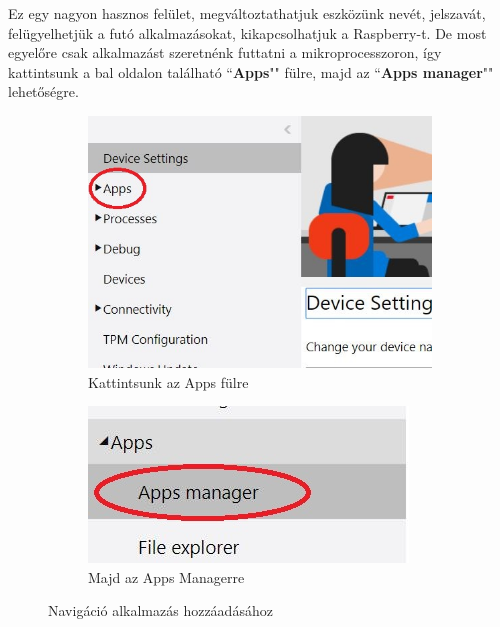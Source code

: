 \documentclass[a4paper,12pt]{report}
\begin{document}
    Ez egy nagyon hasznos felület, megváltoztathatjuk eszközünk nevét, jelszavát, felügyelhetjük a futó alkalmazásokat,
    kikapcsolhatjuk a Raspberry-t. De most egyelőre csak alkalmazást szeretnénk futtatni a mikroprocesszoron, így kattintsunk
    a bal oldalon található ``\textbf{Apps}"" fülre, majd az ``\textbf{Apps manager}"" lehetőségre.

\begin{figure}[h!]
    \centering
    \begin{subfigure}[b]{0.4\linewidth}
        \includegraphics[width=\linewidth]{images/apps.jpg}
        \caption{Kattintsunk az Apps fülre}
    \end{subfigure}
    \begin{subfigure}[b]{0.4\linewidth}
        \includegraphics[width=\linewidth]{images/appsmanager.jpg}
        \caption{Majd az Apps Managerre}
    \end{subfigure}
    \caption{Navigáció alkalmazás hozzáadásához}
    \label{fig:Apps manager}
\end{figure}
\end{document}
